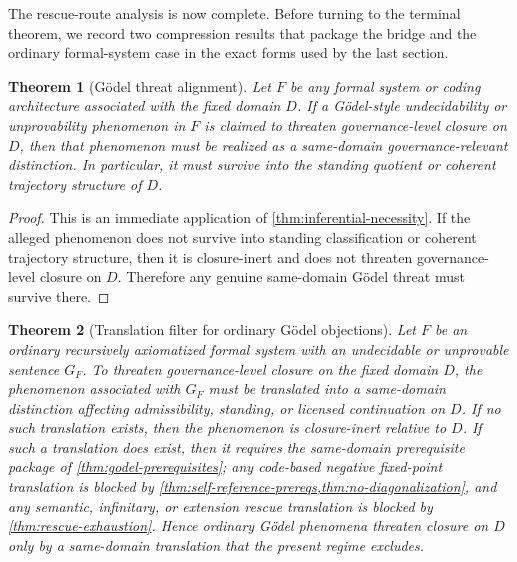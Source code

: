\documentclass[11pt]{article}
\theoremstyle{plain}
\newtheorem{theorem}{Theorem}[section]
\theoremstyle{definition}
\newcommand{\domain}{D}
\begin{document}
The rescue-route analysis is now complete. Before turning to the terminal theorem, we record two compression results that package the bridge and the ordinary formal-system case in the exact forms used by the last section.

\begin{theorem}[G\"odel threat alignment]
\label{thm:alignment}
Let $F$ be any formal system or coding architecture associated with the fixed domain $\domain$. If a G\"odel-style undecidability or unprovability phenomenon in $F$ is claimed to threaten governance-level closure on $\domain$, then that phenomenon must be realized as a same-domain governance-relevant distinction. In particular, it must survive into the standing quotient or coherent trajectory structure of $\domain$.
\end{theorem}

\begin{proof}
This is an immediate application of \cref{thm:inferential-necessity}. If the alleged phenomenon does not survive into standing classification or coherent trajectory structure, then it is closure-inert and does not threaten governance-level closure on $\domain$. Therefore any genuine same-domain G\"odel threat must survive there.
\end{proof}

\begin{theorem}[Translation filter for ordinary G\"odel objections]
\label{thm:translation-filter}
Let $F$ be an ordinary recursively axiomatized formal system with an undecidable or unprovable sentence $G_F$. To threaten governance-level closure on the fixed domain $\domain$, the phenomenon associated with $G_F$ must be translated into a same-domain distinction affecting admissibility, standing, or licensed continuation on $\domain$. If no such translation exists, then the phenomenon is closure-inert relative to $\domain$. If such a translation does exist, then it requires the same-domain prerequisite package of \cref{thm:godel-prerequisites}; any code-based negative fixed-point translation is blocked by \cref{thm:self-reference-prereqs,thm:no-diagonalization}, and any semantic, infinitary, or extension rescue translation is blocked by \cref{thm:rescue-exhaustion}. Hence ordinary G\"odel phenomena threaten closure on $\domain$ only by a same-domain translation that the present regime excludes.
\end{theorem}
\end{document}
